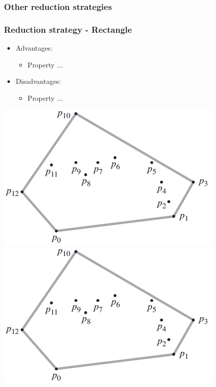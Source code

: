 \subsubsection{Other reduction strategies}
\begin{frame}
\frametitle{Reduction strategy - Rectangle}
\begin{multicols}{2}
	\begin{itemize}
		\item Advantages:
		\begin{itemize}
			\item Property ...
		\end{itemize}
		\item Disadvantages:
		\begin{itemize}
			\item Property ...
		\end{itemize}
	\end{itemize}
\columnbreak
	\begin{center}
		\includegraphics[scale=0.5]{graphics/convexHull-example}\\
		\includegraphics[scale=0.5]{graphics/convexHull-example}
	\end{center}
\end{multicols}
\end{frame}
